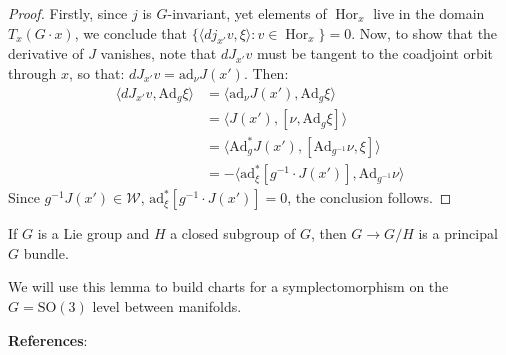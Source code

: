 \begin{proof}
Firstly, since $j$ is $G$-invariant, yet elements of $\operatorname{Hor}_{x}$ live in the domain $T_{x}(G \cdot x)$, we conclude that $\{\langle dj_{x'} v, \xi \rangle: v \in \operatorname{Hor}_{x} \} = 0$. Now, to show that the derivative of $J$ vanishes, note that $dJ_{x'} v$ must be tangent to the coadjoint orbit through $x$, so that:
$dJ_{x'} v = \mathrm{ad}_{\nu} J(x')$. Then:
\begin{align}
\langle dJ_{x'} v, \mathrm{Ad}_{g} \xi \rangle &= \langle \mathrm{ad}_{\nu} J(x'), \mathrm{Ad}_{g} \xi \rangle\\
&= \langle J(x'), [\nu, \mathrm{Ad}_{g} \xi] \rangle\\
&= \langle \mathrm{Ad}_{g}^{*} J(x'), [\mathrm{Ad}_{g^{-1}} \nu, \xi] \rangle\\
&= -\langle \mathrm{ad}^{*}_{\xi} \left[ g^{-1} \cdot J(x') \right], \mathrm{Ad}_{g^{-1}} \nu \rangle
\end{align}
Since $g^{-1} J(x') \in \mathcal{W}$, $\mathrm{ad}^{*}_{\xi} \left[ g^{-1} \cdot J(x') \right] = 0$, the conclusion follows.
\end{proof}
\begin{lemma}[Classical] \label{lem:local-sections}
If $G$ is a Lie group and $H$ a closed subgroup of $G$, then $G \to G/H$ is a principal $G$ bundle.
\end{lemma}
We will use this lemma to build charts for a symplectomorphism on the $G = \mathrm{SO}(3)$ level between manifolds. 

\noindent \textbf{References}: \textcite{Blaom1996}

